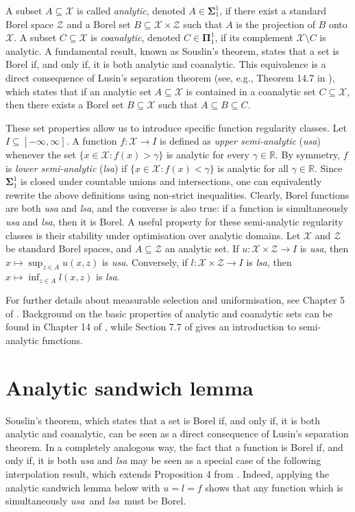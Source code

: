 \documentclass[10pt, a4paper]{article}
\newcommand{\lsa}{\emph{lsa}\xspace}
\newcommand{\usa}{\emph{usa}\xspace}
\newcommand{\X}{\mathcal X}
\begin{document}
A subset $A \subseteq \X$ is called \emph{analytic}, denoted $A \in \mathbf{\Sigma}^1_1$, if there exist a standard Borel space $\mathcal{Z}$ and a Borel set $B \subseteq \X \times \mathcal{Z}$ such that $A$ is the projection of $B$ onto $\X$. A subset $C \subseteq \X$ is \emph{coanalytic}, denoted $C \in \mathbf{\Pi}^1_1$, if its complement $\X \setminus C$ is analytic. A fundamental result, known as Souslin's theorem, states that a set is Borel if, and only if, it is both analytic and coanalytic. This equivalence is a direct consequence of Lusin's separation theorem (see, e.g., Theorem 14.7 in \cite{kechris1995classical}), which states that if an analytic set $A \subseteq \X$ is contained in a coanalytic set $C \subseteq \X$, then there exists a Borel set $B \subseteq \X$ such that $A \subseteq B \subseteq C$.

These set properties allow us to introduce specific function regularity classes. Let $I\subseteq[-\infty,\infty]$. A function $f : \X \to I$ is defined as \emph{upper semi-analytic} (\usa) whenever the set $\{x \in \X : f(x) > \gamma\}$ is analytic for every $\gamma \in \mathbb{R}$. By symmetry, $f$ is \emph{lower semi-analytic} (\lsa) if $\{x \in \X : f(x) < \gamma\}$ is analytic for all $\gamma \in \mathbb{R}$. Since  $\mathbf{\Sigma}^1_1$ is closed under countable unions and intersections, one can equivalently rewrite the above definitions using non-strict inequalities. Clearly, Borel functions are both \usa and \lsa, and the converse is also true: if a function is simultaneously \usa and \lsa, then it is Borel. A useful property for these semi-analytic regularity classes is their stability  under optimisation over analytic domains. Let $\X$ and $\mathcal{Z}$ be standard Borel spaces, and $A \subseteq \mathcal{Z}$ an analytic set. If $u: \X \times \mathcal{Z} \to I$ is \usa, then $x\mapsto \sup_{z \in A} u(x, z)$ is \usa. Conversely, if $l: \X \times \mathcal{Z} \to I$ is \lsa, then $x\mapsto \inf_{z \in A} l(x, z)$ is \lsa.

For further details about measurable selection and uniformisation, see Chapter 5 of \cite{srivastava1998course}. Background on the basic properties of analytic and coanalytic sets can be found in Chapter 14 of \cite{kechris1995classical}, while Section 7.7 of \cite{bertsekas1978stochastic} gives an introduction to semi-analytic functions.

\section{Analytic sandwich lemma}
Souslin's theorem, which states that a set is Borel if, and only if, it is both analytic and coanalytic, can be seen as a direct consequence of Lusin's separation theorem. In a completely analogous way, the fact that a function is Borel if, and only if, it is both \usa and \lsa may be seen as a special case of the following interpolation result, which extends Proposition 4 from \cite{clerico2025optimality}. Indeed, applying the analytic sandwich lemma below with $u=l=f$ shows that any function which is simultaneously \usa\ and \lsa\ must be Borel.
\end{document}
